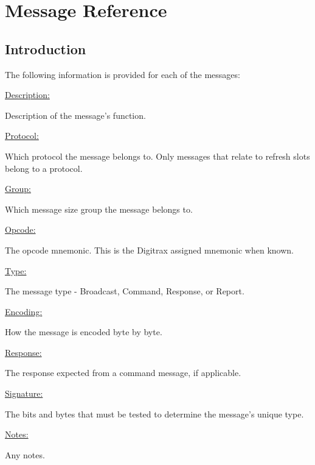  

\chapter[Message Reference]{Message Reference}

\section{Introduction}

The following information is provided for each of the messages:

\underline{Description:}

Description of the message's function.

\underline{Protocol:}

Which protocol the message belongs to. Only messages that relate to refresh slots belong to a protocol.

\underline{Group:}

Which message size group the message belongs to.

\underline{Opcode:}

The opcode mnemonic. This is the Digitrax assigned mnemonic when known.

\underline{Type:}

The message type - \gls{Broadcast}, \gls{Command}, \gls{Response}, or \gls{Report}.

\underline{Encoding:} 

How the message is encoded byte by byte.

\underline{Response:} 

The response expected from a command message, if applicable.

\underline{Signature:}

The bits and bytes that must be tested to determine the message's unique type.

\underline{Notes:} 

Any notes.

